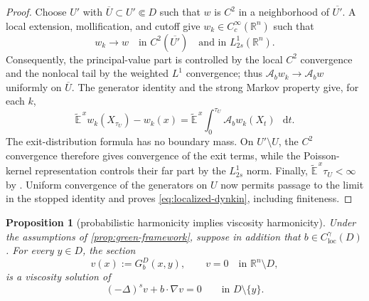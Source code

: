 \documentclass[10pt,a4paper]{amsart}
\numberwithin{equation}{section}
\newtheorem{proposition}[theorem]{Proposition}
\newcommand{\R}{\mathbb R}
\newcommand{\differential}{\mathop{}\!\mathrm d}
\begin{document}
\begin{proof}
Choose $U'$ with $\overline U\subset U'\Subset D$ such that $w$ is $C^2$
in a neighborhood of $\overline{U'}$.  A local extension, mollification,
and cutoff give $w_k\in C_c^\infty(\R^n)$ such that
\[
 w_k\longrightarrow w\quad\text{in }C^2(\overline{U'})
 \quad\text{and in }L^1_{2s}(\R^n).
\]
Consequently, the principal-value part is controlled by the local $C^2$
convergence and the nonlocal tail by the weighted $L^1$ convergence; thus
$\mathcal A_bw_k\to\mathcal A_bw$ uniformly on $\overline U$.  The
generator identity \cite[(36)]{BogdanJakubowski2012} and the strong Markov
property give, for each $k$,
\[
 \widetilde{\mathbb E}^{\,x}w_k(X_{\tau_U})-w_k(x)
 =\widetilde{\mathbb E}^{\,x}\int_0^{\tau_U}
   \mathcal A_bw_k(X_t)\,\differential t.
\]
The exit-distribution formula \cite[Lemmas~6 and 14]{BogdanJakubowski2012}
has no boundary mass.  On $U'\setminus U$, the $C^2$ convergence therefore
gives convergence of the exit terms, while the Poisson-kernel
representation \cite[(38)--(39)]{BogdanJakubowski2012} controls their far
part by the $L^1_{2s}$ norm.  Finally,
$\widetilde{\mathbb E}^{\,x}\tau_U<\infty$ by
\cite[Lemma~7]{BogdanJakubowski2012}.  Uniform convergence of the
generators on $U$ now permits passage to the limit in the stopped identity
and proves \eqref{eq:localized-dynkin}, including finiteness.
\end{proof}

\begin{proposition}[probabilistic harmonicity implies viscosity harmonicity]
\label{prop:green-viscosity}
Under the assumptions of \cref{prop:green-framework}, suppose in addition
that $b\in C^\gamma_{\mathrm{loc}}(D)$.  For every $y\in D$, the section
\[
 v(x):=G_b^D(x,y),\qquad v=0\quad\text{in }\R^n\setminus D,
\]
is a viscosity solution of
\begin{equation}\label{eq:green-viscosity-equation}
 (-\Delta)^sv+b\cdot\nabla v=0
 \qquad\text{in }D\setminus\{y\}.
\end{equation}
\end{proposition}
\end{document}
